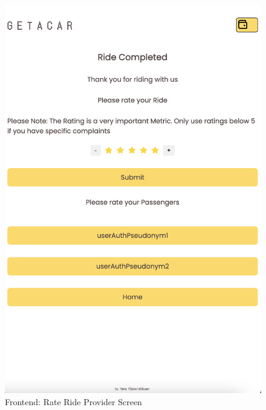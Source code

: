 \begin{figure}[H]
    \centering
    
    \begin{minipage}{0.45\linewidth}
        \centering
        \includegraphics[width=\linewidth]{data/ffss/11.png}
        \caption{Frontend: Rate Ride Provider Screen}
        \label{fig:RateRideProviderScreen}
    \end{minipage}
    \hfill
    \begin{minipage}{0.45\linewidth}
        \centering

\end{minipage}
\end{figure}
